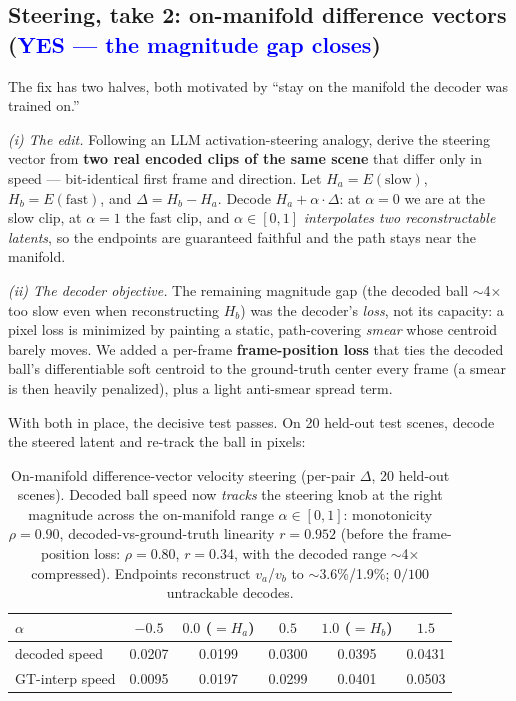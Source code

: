 \documentclass{article} %
\newcommand{\alphanorm}{\ensuremath{\alpha}}        %
\begin{document}
  \subsection{Steering, take 2: on-manifold difference vectors
      (\textcolor{blue}{YES --- the magnitude gap closes})}
  The fix has two halves, both motivated by ``stay on the manifold the decoder was trained on.''

  \emph{(i) The edit.} Following an LLM activation-steering analogy, derive the steering vector from
  \textbf{two real encoded clips of the same scene} that differ only in speed --- bit-identical first
  frame and direction. Let $H_a=E(\text{slow})$, $H_b=E(\text{fast})$, and $\Delta=H_b-H_a$. Decode
  $H_a+\alphanorm\!\cdot\!\Delta$: at $\alphanorm{=}0$ we are at the slow clip, at $\alphanorm{=}1$ the
  fast clip, and $\alphanorm\in[0,1]$ \emph{interpolates two reconstructable latents}, so the endpoints
  are guaranteed faithful and the path stays near the manifold.

  \emph{(ii) The decoder objective.} The remaining magnitude gap (the decoded ball $\sim$4$\times$ too
  slow even when reconstructing $H_b$) was the decoder's \emph{loss}, not its capacity: a pixel loss is
  minimized by painting a static, path-covering \emph{smear} whose centroid barely moves. We added a
  per-frame \textbf{frame-position loss} that ties the decoded ball's differentiable soft centroid to
  the ground-truth center every frame (a smear is then heavily penalized), plus a light anti-smear
  spread term.

  With both in place, the decisive test passes. On 20 held-out test scenes, decode the steered latent
  and re-track the ball in pixels:

  \begin{table}[h]
  \caption{On-manifold difference-vector velocity steering (per-pair $\Delta$, 20 held-out scenes).
  Decoded ball speed now \emph{tracks} the steering knob at the right magnitude across the on-manifold
  range $\alphanorm\in[0,1]$: monotonicity $\rho=0.90$, decoded-vs-ground-truth linearity $r=0.952$
  (before the frame-position loss: $\rho=0.80$, $r=0.34$, with the decoded range $\sim$4$\times$
  compressed). Endpoints reconstruct $v_a$/$v_b$ to $\sim$3.6\%/1.9\%; $0/100$ untrackable decodes.}
  \label{tab:diffsteer}
  \begin{center}
  \begin{tabular}{lccccc}
  \toprule
  \alphanorm{} & $-0.5$ & $0.0$ ($=H_a$) & $0.5$ & $1.0$ ($=H_b$) & $1.5$ \\
  \midrule
  decoded speed   & 0.0207 & 0.0199 & 0.0300 & 0.0395 & 0.0431 \\
  GT-interp speed & 0.0095 & 0.0197 & 0.0299 & 0.0401 & 0.0503 \\
  \bottomrule
  \end{tabular}
  \end{center}
  \end{table}
\end{document}
